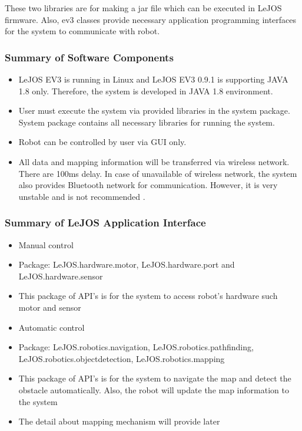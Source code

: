 \documentclass[10pt,a4paper,titlepage]{article}
\begin{document}
	These two libraries are for making a jar file which can be executed in LeJOS firmware. Also, ev3 classes provide necessary application programming interfaces for the system to communicate with robot.
	
	\subsubsection*{Summary of Software Components}
	\begin{itemize}
		\item LeJOS EV3 is running in Linux and LeJOS EV3 0.9.1 is supporting JAVA 1.8 only.     
		Therefore, the system is developed in JAVA 1.8 environment.
		\item User must execute the system via provided libraries in the system package. System package contains all necessary libraries for running the system.
		\item Robot can be controlled by user via GUI only.
		\item All data and mapping information will be transferred via wireless network. There are 100ms delay. In case of unavailable of wireless network, the system also provides Bluetooth network for communication. However, it is very unstable and is not recommended .
	\end{itemize} 
	
	\subsubsection*{Summary of LeJOS Application Interface}
	\begin{itemize}
		\item Manual control
		\item Package: LeJOS.hardware.motor, LeJOS.hardware.port and LeJOS.hardware.sensor
		\item This package of API's is for the system to access robot’s hardware such motor and sensor
		\item Automatic control
		\item Package: LeJOS.robotics.navigation, LeJOS.robotics.pathfinding, LeJOS.robotics.objectdetection, LeJOS.robotics.mapping
		\item This package of API's is for the system to navigate the map and detect the obstacle automatically. Also, the robot will update the map information to the system
		\item The detail about mapping mechanism will provide later
	\end{itemize} 
	
\end{document}
